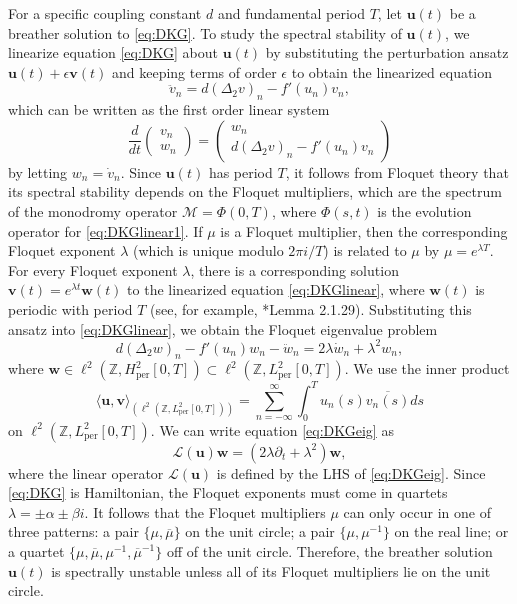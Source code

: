 \documentclass[12pt,reqno]{amsart}
\def\Z{{\mathbb Z}}
\def\per{\textrm{per}}
\def\calL{\mathcal{L}}
\def\calM{\mathcal{M}}
\newcommand{\uvec}{\mathbf{u}}
\newcommand{\vvec}{\mathbf{v}}
\newcommand{\wvec}{\mathbf{w}}
\theoremstyle{definition}
\begin{document}
For a specific coupling constant $d$ and fundamental period $T$, let $\uvec(t)$ be a breather solution to \cref{eq:DKG}. To study the spectral stability of $\uvec(t)$, we linearize equation \cref{eq:DKG} about $\uvec(t)$ by substituting the perturbation ansatz $\uvec(t) + \epsilon \vvec(t)$ and keeping terms of order $\epsilon$ to obtain the linearized equation
\begin{equation}\label{eq:DKGlinear}
\ddot{v}_n = d (\Delta_2 v)_n - f'(u_n)v_n,
\end{equation}
which can be written as the first order linear system
\begin{equation}\label{eq:DKGlinear1}
\frac{d}{dt} \begin{pmatrix} v_n \\ w_n \end{pmatrix} = 
\begin{pmatrix}
w_n \\ 
d (\Delta_2 v)_n - f'(u_n)v_n
\end{pmatrix}
\end{equation}
by letting $w_n = \dot{v}_n$. Since $\uvec(t)$ has period $T$, it follows from Floquet theory that its spectral stability depends on the Floquet multipliers, which are the spectrum of the monodromy operator $\calM = \Phi(0, T)$, where $\Phi(s, t)$ is the evolution operator for \cref{eq:DKGlinear1}. 
If $\mu$ is a Floquet multiplier, then the corresponding Floquet exponent $\lambda$ (which is unique modulo $2 \pi i/T$) is related to $\mu$ by $\mu = e^{\lambda T}$. 
For every Floquet exponent $\lambda$, there is a corresponding solution $\vvec(t) = e^{\lambda t} \wvec(t)$ to the linearized equation \cref{eq:DKGlinear}, where $\wvec(t)$ is periodic with period $T$ (see, for example, \cite{Kapitula2013}*{Lemma 2.1.29}). Substituting this ansatz into \cref{eq:DKGlinear}, we obtain the Floquet eigenvalue problem
\begin{equation}\label{eq:DKGeig}
d (\Delta_2 w)_n - f'(u_n)w_n - \ddot{w}_n = 2 \lambda \dot{w}_n + \lambda^2 w_n,
\end{equation}
where $\wvec \in \ell^2(\Z, H^2_\per[0,T]) \subset \ell^2(\Z, L^2_\per[0,T])$. We use the inner product
\begin{equation}\label{eq:IP1}
\langle \uvec, \vvec \rangle_{(\ell^2(\Z, L^2_\per[0,T]))} = \sum_{n=-\infty}^\infty \int_0^T u_n(s) \overline{v_n(s)} ds
\end{equation}
on $\ell^2(\Z, L^2_\per[0,T])$. We can write equation \cref{eq:DKGeig} as 
\begin{equation}\label{eq:DKGeigL}
\calL(\uvec)\wvec = (2 \lambda \partial_t + \lambda^2 )\wvec,
\end{equation}
where the linear operator $\calL(\uvec)$ is defined by the LHS of \cref{eq:DKGeig}. Since \cref{eq:DKG} is Hamiltonian, the Floquet exponents must come in quartets $\lambda = \pm \alpha \pm \beta i$. It follows that the Floquet multipliers $\mu$ can only occur in one of three patterns: a pair $\{ \mu, \overline{\mu} \}$ on the unit circle; a pair $\{ \mu, \mu^{-1} \}$ on the real line; or a quartet $\{ \mu, \overline{\mu}, \mu^{-1}, \overline{\mu}^{-1} \}$ off of the unit circle. Therefore, the breather solution $\uvec(t)$ is spectrally unstable unless all of its Floquet multipliers lie on the unit circle.
\end{document}
